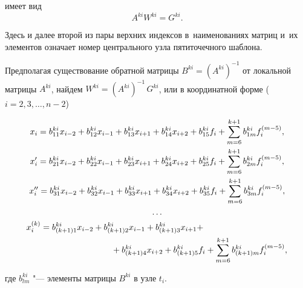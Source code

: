  имеет вид $$A^{ki}W^{ki}=G^{ki}.$$

Здесь и далее  второй из пары верхних индексов в~наименованиях матриц и~их элементов означает номер центрального узла пятиточечного шаблона.



Предполагая существование обратной матрицы $  B^{ki}=(A^{ki})^{-1}$  от локальной матрицы  $  A^{ki}$, найдем  $  W^{ki}=(A^{ki})^{-1}\,G^{ki}$, или в координатной форме ($i=2,  3,  \dots,  n-2$)


\begin{gather}

\label{mvc:eq8}

x_i=b_{11}^{ki} x_{i-2}+b_{12}^{ki} x_{i-1}+b_{13}^{ki} x_{i+1}+b_{14}^{ki} x_{i+2}+b_{15}^{ki} f_{i}+\sum_{m=6}^{k+1}b_{1m}^{ki} f_i^{(m-5)},

\\

\label{mvc:eq9}

x'_i=b_{21}^{ki} x_{i-2}+b_{22}^{ki} x_{i-1}+b_{23}^{ki} x_{i+1}+b_{24}^{ki} x_{i+2}+b_{25}^{ki} f_{i}+\sum_{m=6}^{k+1}b_{2m}^{ki} f_i^{(m-5)},

\\

\label{mvc:eq11}

x''_i=b_{31}^{ki} x_{i-2}+b_{32}^{ki} x_{i-1}+b_{33}^{ki} x_{i+1}+b_{34}^{ki} x_{i+2}+b_{35}^{ki} f_{i}+\sum_{m=6}^{k+1}b_{3m}^{ki} f_i^{(m-5)},

\\

\dots

\\

 x^{(k)}_i=b_{(k+1)1}^{ki} x_{i-2}+b_{(k+1)2}^{ki} x_{i-1}+b_{(k+1)3}^{ki} x_{i+1}

+ \hspace{3.5cm} \\

\hspace{3.5cm} 

{}+b_{(k+1)4}^{ki} x_{i+2}+b_{(k+1)5}^{ki} f_{i}+\sum_{m=6}^{k+1}b_{(k+1)m}^{ki} f_i^{(m-5)},

\label{mvc:eq11}

\end{gather}

где  $  b_{lm}^{ki}$  "--- элементы  матрицы $  B^{ki}$  в узле $  t_i$.



